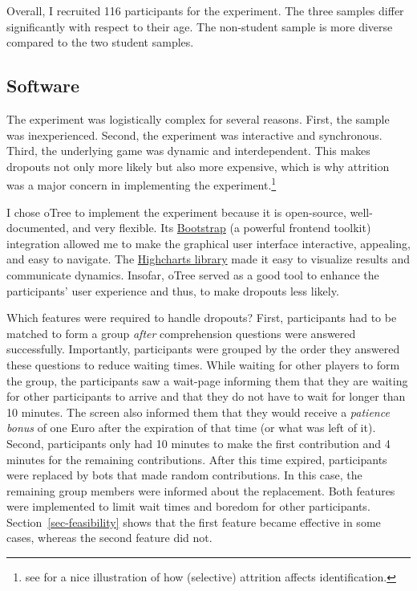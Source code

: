 \documentclass[
  authoryear,
  review,
  3p,
  onecolumn]{elsarticle}
\begin{document}
Overall, I recruited 116 participants for the experiment. The three
samples differ significantly with respect to their age. The non-student
sample is more diverse compared to the two student samples.

\hypertarget{sec-software}{%
\subsection{Software}\label{sec-software}}

The experiment was logistically complex for several reasons. First, the
sample was inexperienced. Second, the experiment was interactive and
synchronous. Third, the underlying game was dynamic and interdependent.
This makes dropouts not only more likely but also more expensive, which
is why attrition was a major concern in implementing the
experiment.\footnote{see \citet{ZhouFischbach2016} for a nice
  illustration of how (selective) attrition affects identification.}

I chose oTree \citep{oTree} to implement the experiment because it is
open-source, well-documented, and very flexible. Its
\href{https://getbootstrap.com/}{Bootstrap} (a powerful frontend
toolkit) integration allowed me to make the graphical user interface
interactive, appealing, and easy to navigate. The
\href{https://www.highcharts.com/}{Highcharts library} made it easy to
visualize results and communicate dynamics. Insofar, oTree served as a
good tool to enhance the participants' user experience and thus, to make
dropouts less likely.

Which features were required to handle dropouts? First, participants had
to be matched to form a group \emph{after} comprehension questions were
answered successfully. Importantly, participants were grouped by the
order they answered these questions to reduce waiting times. While
waiting for other players to form the group, the participants saw a
wait-page informing them that they are waiting for other participants to
arrive and that they do not have to wait for longer than 10 minutes. The
screen also informed them that they would receive a \emph{patience
bonus} of one Euro after the expiration of that time (or what was left
of it). Second, participants only had 10 minutes to make the first
contribution and 4 minutes for the remaining contributions. After this
time expired, participants were replaced by bots that made random
contributions. In this case, the remaining group members were informed
about the replacement. Both features were implemented to limit wait
times and boredom for other participants. Section~\ref{sec-feasibility}
shows that the first feature became effective in some cases, whereas the
second feature did not.
\end{document}

